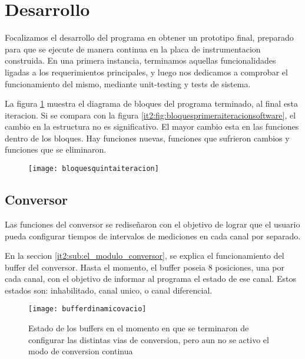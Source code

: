 
\section{Desarrollo} %
\label{it5:sec:desarrollo}

Focalizamos el desarrollo del programa en obtener un prototipo final, preparado para que se ejecute de manera continua en la placa de instrumentacion construida. En una primera instancia, terminamos aquellas funcionalidades ligadas a los requerimientos principales, y luego nos dedicamos a comprobar el funcionamiento del mismo, mediante unit-testing y tests de sistema.

La figura \ref{it5:fig:bloquesquintaiteracion} muestra el diagrama de bloques del programa terminado, al final esta iteracion. Si se compara con la figura \ref{it2:fig:bloquesprimeraiteracionsoftware}, el cambio en la estructura no es significativo. El mayor cambio esta en las funciones dentro de los bloques. Hay funciones nuevas, funciones que sufrieron cambios y funciones que se eliminaron.

\begin{figure}[h]
  \centering
  \texttt{[image: bloquesquintaiteracion]}
  \caption{}\label{it5:fig:bloquesquintaiteracion}
\end{figure}

\subsection{Conversor} %
\label{sub:conversor}

Las funciones del conversor se rediseñaron con el objetivo de lograr que el usuario pueda configurar tiempos de intervalos de mediciones en cada canal por separado.

En la seccion \ref{it2:sub:el_modulo_conversor}, se explica el funcionamiento del buffer del conversor. Hasta el momento, el buffer poseia 8 posiciones, una por cada canal, con el objetivo de informar al programa el estado de ese canal. Estos estados son: inhabilitado, canal unico, o canal diferencial.

\begin{figure}[h]
  \centering
  \texttt{[image: bufferdinamicovacio]}
  \caption{Estado de los buffers en el momento en que se terminaron de configurar las distintas vias de conversion, pero aun no se activo el modo de conversion continua}\label{it5:fig:bufferdinamicovacio}
\end{figure}

